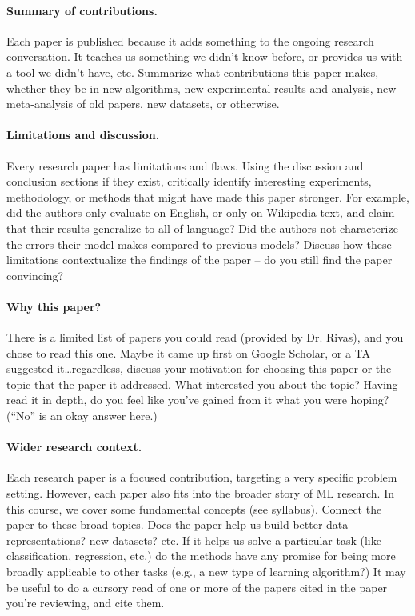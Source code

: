 \documentclass{article}
\begin{document}
\paragraph{Summary of contributions.}
Each paper is published because it adds something to the ongoing research conversation. It teaches us something we didn't know before, or provides us with a tool we didn't have, etc.
Summarize what contributions this paper makes, whether they be in new algorithms, new experimental results and analysis, new meta-analysis of old papers, new datasets, or otherwise.

\paragraph{Limitations and discussion.}
Every research paper has limitations and flaws.
Using the discussion and conclusion sections if they exist, critically identify interesting experiments, methodology, or methods that might have made this paper stronger.
For example, did the authors only evaluate on English, or only on Wikipedia text, and claim that their results generalize to all of language?
Did the authors not characterize the errors their model makes compared to previous models?
Discuss how these limitations contextualize the findings of the paper -- do you still find the paper convincing?

\paragraph{Why this paper?}
There is a limited list of papers you could read (provided by Dr. Rivas), and you chose to read this one.
Maybe it came up first on Google Scholar, or a TA suggested it\dots regardless, discuss your motivation for choosing this paper or the topic that the paper it addressed.
What interested you about the topic?
Having read it in depth, do you feel like you've gained from it what you were hoping? (``No'' is an okay answer here.)

\paragraph{Wider research context.}
Each research paper is a focused contribution, targeting a very specific problem setting.
However, each paper also fits into the broader story of ML research.
In this course, we cover some fundamental concepts (see syllabus).
Connect the paper to these broad topics.
Does the paper help us build better data representations? new datasets? etc.
If it helps us solve a particular task (like classification, regression, etc.) do the methods have any promise for being more broadly applicable to other tasks (e.g., a new type of learning algorithm?)
It may be useful to do a cursory read of one or more of the papers cited in the paper you're reviewing, and cite them.
\end{document}
